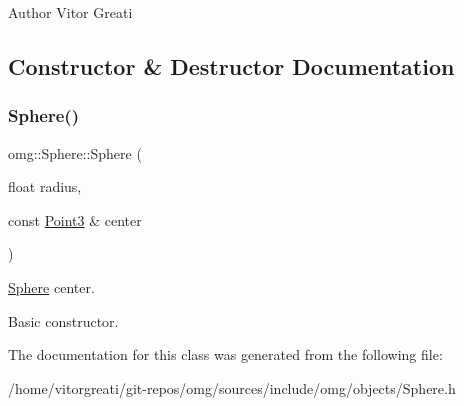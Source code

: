 \begin{DoxyAuthor}{Author}
Vitor Greati 
\end{DoxyAuthor}


\subsection{Constructor \& Destructor Documentation}
\mbox{\label{classomg_1_1_sphere_a81f9a5180b9c883ce00669d4af4d38db}} 
\subsubsection{\texorpdfstring{Sphere()}{Sphere()}}
{\footnotesize\ttfamily omg\+::\+Sphere\+::\+Sphere (\begin{DoxyParamCaption}\item[{float}]{radius,  }\item[{const \mbox{\hyperlink{namespaceomg_af3df7d66f0c70fe64649fcbe00edba5e}{Point3}} \&}]{center }\end{DoxyParamCaption})\hspace{0.3cm}{\ttfamily [inline]}}



\mbox{\hyperlink{classomg_1_1_sphere}{Sphere}} center. 

Basic constructor. 

The documentation for this class was generated from the following file\+:\begin{DoxyCompactItemize}
\item 
/home/vitorgreati/git-\/repos/omg/sources/include/omg/objects/Sphere.\+h\end{DoxyCompactItemize}

